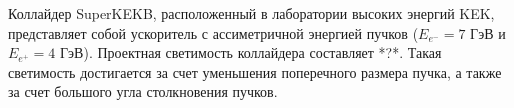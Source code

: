 Коллайдер SuperKEKB, расположенный в лаборатории высоких энергий KEK, представляет собой ускоритель с ассиметричной энергией пучков ($E_{e^-}=7$ ГэВ и $E_{e^+}=4$ ГэВ). Проектная светимость коллайдера составляет *?*. Такая светимость достигается за счет уменьшения поперечного размера пучка, а также за счет большого угла столкновения пучков. 

